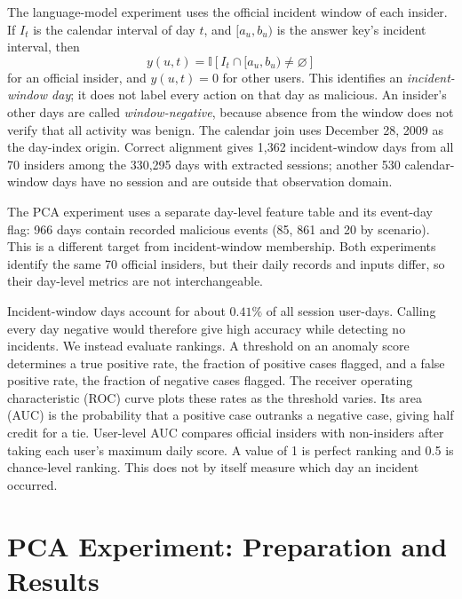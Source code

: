 \documentclass[12pt]{report}
\begin{document}
The language-model experiment uses the official incident window of each insider. If $I_t$ is
the calendar interval of day $t$, and $[a_u,b_u)$ is the answer key's incident interval, then
\begin{equation}
y(u,t)=\mathbb{I}\!\left[I_t\cap[a_u,b_u)\ne\varnothing\right]
\label{eq:day-label}
\end{equation}
for an official insider, and $y(u,t)=0$ for other users. This identifies an
\emph{incident-window day}; it does not label every action on that day as malicious.
An insider's other days are called \emph{window-negative}, because absence from the window
does not verify that all activity was benign. The calendar join uses December 28, 2009 as
the day-index origin. Correct alignment gives 1,362 incident-window days from all 70 insiders
among the 330,295 days with extracted sessions; another 530 calendar-window days have no
session and are outside that observation domain.

The PCA experiment uses a separate day-level feature table and its event-day flag: 966 days
contain recorded malicious events (85, 861 and 20 by scenario). This is a different target
from incident-window membership. Both experiments identify the same 70 official insiders,
but their daily records and inputs differ, so their day-level metrics are not interchangeable.

Incident-window days account for about $0.41\%$ of all session user-days. Calling every day
negative would therefore give high accuracy while detecting no incidents. We instead evaluate
rankings. A threshold on an anomaly score determines a true positive rate, the fraction of
positive cases flagged, and a false positive rate, the fraction of negative cases flagged.
The receiver operating characteristic (ROC) curve plots these rates as the threshold varies.
Its area (AUC) is the probability that a positive case outranks a negative case, giving half
credit for a tie. User-level AUC compares official insiders with non-insiders after taking
each user's maximum daily score. A value of 1 is perfect ranking and 0.5 is chance-level
ranking. This does not by itself measure which day an incident occurred.

\section{PCA Experiment: Preparation and Results}
\label{sec:pca-data}
\end{document}
